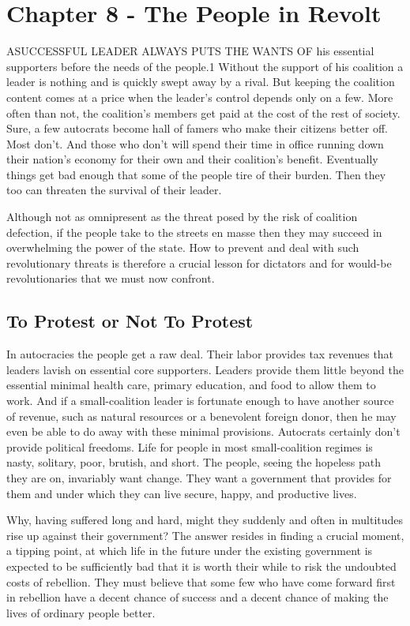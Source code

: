 \documentclass[10pt]{article}
\begin{document}
\section{Chapter 8 - The People in Revolt}

{\large ASUCCESSFUL LEADER ALWAYS PUTS THE WANTS OF his essential supporters
before the needs of the people.1 Without the support of his coalition a leader is
nothing and is quickly swept away by a rival. But keeping the coalition content
comes at a price when the leader's control depends only on a few. More often than
not, the coalition's members get paid at the cost of the rest of society. Sure, a
few autocrats become hall of famers who make their citizens better off. Most
don't. And those who don't will spend their time in office running down their
nation's economy for their own and their coalition's benefit. Eventually things
get bad enough that some of the people tire of their burden. Then they too can
threaten the survival of their leader.}

{\large Although not as omnipresent as the threat posed by the risk of coalition
defection, if the people take to the streets en masse then they may succeed in
overwhelming the power of the state. How to prevent and deal with such
revolutionary threats is therefore a crucial lesson for dictators and for
would-be revolutionaries that we must now confront.}

\subsection{To Protest or Not To Protest}

{\large In autocracies the people get a raw deal. Their labor provides tax
revenues that leaders lavish on essential core supporters. Leaders provide them
little beyond the essential minimal health care, primary education, and food to
allow them to work. And if a small-coalition leader is fortunate enough to have
another source of revenue, such as natural resources or a benevolent foreign
donor, then he may even be able to do away with these minimal provisions.
Autocrats certainly don't provide political freedoms. Life for people in most
small-coalition regimes is nasty, solitary, poor, brutish, and short. The people,
seeing the hopeless path they are on, invariably want change. They want a
government that provides for them and under which they can live secure, happy,
and productive lives.}

{\large Why, having suffered long and hard, might they suddenly and often in
multitudes rise up against their government? The answer resides in finding a
crucial moment, a tipping point, at which life in the future under the existing
government is expected to be sufficiently bad that it is worth their while to
risk the undoubted costs of rebellion. They must believe that some few who have
come forward first in rebellion have a decent chance of success and a decent
chance of making the lives of ordinary people better.}
\end{document}
